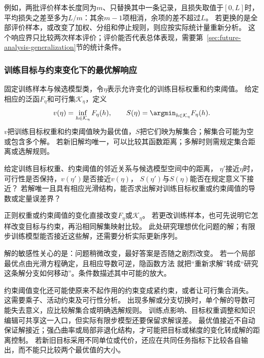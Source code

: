 例如，两批评价样本长度同为$m$、只替换其中一条记录，且损失取值于$[0,L]$时，
平均损失之差至多为$L/m$：其余$m-1$项相消，余项的差不超过$L$。
若更换的是全部评价样本，或改变了加权、分组和停止规则，则应按实际统计量重新分析。
这个响应界只比较两次样本评价；评价能否代表总体表现，需要第~\ref{sec:future-analysis-generalization}节的统计条件。

\subsubsection{训练目标与约束变化下的最优解响应}
\label{sec:future-analysis-solution-sensitivity}

固定训练样本与候选模型类，令$\eta$表示允许变化的训练目标权重和约束阈值。
给定相应的泛函$F_\eta$和可行集$\mathcal K_\eta$，定义
\[
  v(\eta)=\inf_{h\in\mathcal K_\eta}F_\eta(h),\qquad
  S(\eta)=\argmin_{h\in\mathcal K_\eta}F_\eta(h).
\]
$v$把训练目标权重和约束阈值映为最优值，$S$把它们映为解集合；解集合可能为空或包含多个解。
若新旧解均唯一，可以比较其函数距离；多解时则需规定集合距离或选解规则。

\begin{mathproblem}[训练目标与约束变化造成的最优值与解集差异]
  \label{question:future-solution-sensitivity}
  给定训练目标权重、约束阈值的邻近关系与候选模型空间中的距离，
  $\eta'$接近$\eta$时，可行性是否保持，$v(\eta')$是否接近$v(\eta)$，
  $S(\eta')$与$S(\eta)$能否在规定意义下接近？
  若解唯一且具有相应光滑结构，能否求出解对训练目标权重或约束阈值的导数或定量误差界？
\end{mathproblem}

正则权重或约束阈值的变化直接改变$F_\eta$或$\mathcal K_\eta$。
若更改训练样本，也可先说明它怎样改变目标与约束，再沿相同解集映射比较。
此处研究理想优化问题的解；有限步训练模型能否接近这些解，还需要分析实际更新序列。

解的敏感性关心的是：问题稍微改变，最好答案是否随之剧烈改变。
若一个局部最优点由光滑方程确定，且相应导数可逆，隐函数方法
就把“重新求解”转成“研究这条解分支如何移动”。条件数描述其中可能的放大。

约束阈值变化还可能使原来不起作用的约束变成紧约束，或者让可行集合消失。
这需要乘子、活动约束及可行性分析。
出现多解或分支切换时，单个解的导数可能失去意义，应比较解集合或明确选解规则。
训练点影响、目标权重调整和知识编辑可共享这一入口，但实际有限步模型还要保留求解误差。
最优值接近不自动保证解接近；强凸曲率或局部非退化结构，才可能把目标或梯度的变化转成解的距离控制。
若新旧目标采用不同单位或代价，还应在共同任务指标下比较各自输出，而不能只比较两个最优值的大小。

